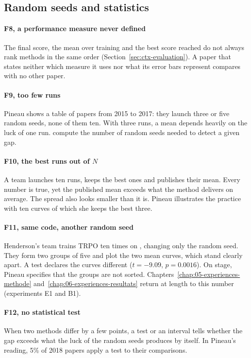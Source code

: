 \subsection{Random seeds and statistics}

\paragraph{F8, a performance measure never defined}
The final score, the mean over training and the best score reached do not always rank methods in the
same order (Section~\ref{sec:ctx-evaluation}). A paper that states neither which measure it uses nor
what its error bars represent compares with no other paper.

\paragraph{F9, too few runs}
Pineau shows a table of papers from 2015 to 2017: they launch three or five random seeds, none of them
ten. With three runs, a mean depends heavily on the luck of one run.
\textcite{colas2018seeds} compute the number of random seeds needed to detect a given gap.

\paragraph{F10, the best runs out of $N$}
A team launches ten runs, keeps the best ones and publishes their mean. Every number is true, yet the
published mean exceeds what the method delivers on average. The spread also looks smaller than it is.
Pineau illustrates the practice with ten curves of which she keeps the best three.

\paragraph{F11, same code, another random seed}
Henderson's team trains TRPO ten times on , changing only the random seed.
They form two groups of five and plot the two mean curves, which stand clearly apart. A test declares
the curves different ($t = -9.09$, $p = 0.0016$). On stage, Pineau specifies that the groups are not
sorted. Chapters~\ref{chap:05-experiences-methode} and~\ref{chap:06-experiences-resultats} return at
length to this number (experiments E1 and B1).

\paragraph{F12, no statistical test}
When two methods differ by a few points, a test or an interval tells whether the gap exceeds what the
luck of the random seeds produces by itself. In Pineau's reading, 5\% of 2018 papers apply a test to
their comparisons.

